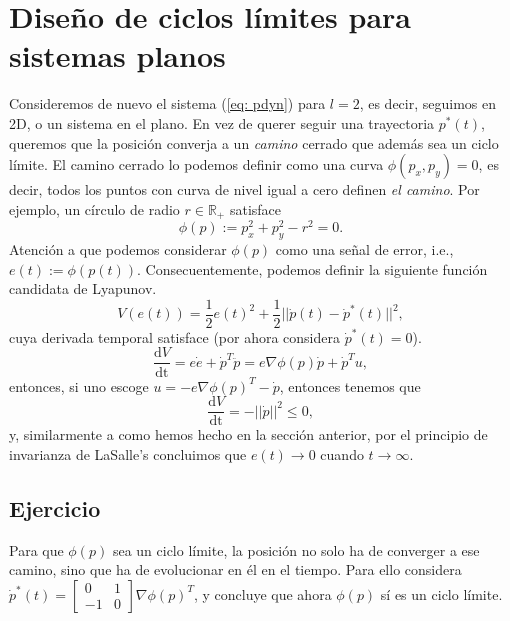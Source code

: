 	\section{Diseño de ciclos límites para sistemas planos}
	Consideremos de nuevo el sistema (\ref{eq: pdyn}) para $l=2$, es decir, seguimos en 2D, o un sistema en el plano. En vez de querer seguir una trayectoria $p^*(t)$, queremos que la posición converja a un \emph{camino} cerrado que además sea un ciclo límite. El camino cerrado lo podemos definir como una curva $\phi(p_x, p_y) = 0$, es decir, todos los puntos con curva de nivel igual a cero definen \emph{el camino}. Por ejemplo, un círculo de radio $r\in\mathbb{R}_+$ 
 satisface
	\begin{equation}
	\phi(p) := p_x^2 + p_y^2 - r^2 = 0.
	\end{equation}
Atención a que podemos considerar $\phi(p)$ como una señal de error, i.e., $e(t) := \phi(p(t))$. Consecuentemente, podemos definir la siguiente función candidata de Lyapunov.
\begin{equation}
	V(e(t)) = \frac{1}{2}e(t)^2 + \frac{1}{2}||\dot p(t) - \dot p^*(t)||^2,
	\label{eq: Ve2}
\end{equation}
	cuya derivada temporal satisface (por ahora considera $\dot p^*(t) = 0$).
	\begin{equation}
		\frac{\mathrm{d}V}{\mathrm{dt}} = e\dot e + \dot p^T\ddot p = e \nabla\phi(p) \dot p + \dot p^T u,
	\end{equation}
	entonces, si uno escoge $u = -e \nabla\phi(p)^T -\dot p$, entonces tenemos que
	\begin{equation}
\frac{\mathrm{d}V}{\mathrm{dt}} = -||\dot p||^2 \leq 0,
	\end{equation}
y, similarmente a como hemos hecho en la sección anterior, por el principio de invarianza de LaSalle's concluimos que $e(t) \to 0$ cuando $t\to\infty$.

\subsection{Ejercicio}
Para que $\phi(p)$ sea un ciclo límite, la posición no solo ha de converger a ese camino, sino que ha de evolucionar en él en el tiempo. Para ello considera $\dot p^*(t) = \begin{bmatrix}0 & 1 \\ -1 & 0\end{bmatrix}\nabla\phi(p)^T$, y concluye que ahora $\phi(p)$ sí es un ciclo límite.

